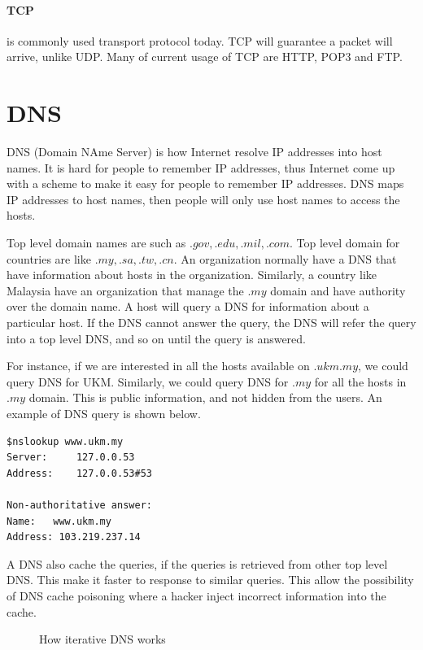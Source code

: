 \documentclass[7x9]{times}
\begin{document}
\paragraph{TCP} is commonly used transport protocol today. 
TCP will guarantee a packet will arrive, unlike UDP. Many 
of current usage of TCP are HTTP, POP3 and FTP.





\section{DNS}

DNS (Domain NAme Server) is how Internet resolve IP
addresses into host names. It is hard for people to remember
IP addresses, thus Internet come up with a scheme to make it
easy for people to remember IP addresses. DNS maps  IP 
addresses to host names, then people will only use host 
names to access the hosts. 

Top level domain names are such as $.gov, .edu, .mil, .com$.
Top level domain for countries are like $.my, .sa, .tw,
.cn$. An organization normally have a DNS that have 
information about hosts in the organization. Similarly, a 
country like Malaysia have an organization that manage the 
$.my$ domain and have authority over the domain name.
A host will query a  DNS for information about a particular
host. If the DNS cannot answer the query, the DNS will refer
the query into a top level DNS, and so on until the query is
answered.

For instance, if we are interested in all the hosts
available on $.ukm.my$, we could query DNS for UKM.
Similarly, we could query DNS for $.my$ for all the hosts in
$.my$ domain. This is public information, and not hidden
from the users. An example of DNS query is shown below.

\begin{verbatim}
$nslookup www.ukm.my
Server:		127.0.0.53
Address:	127.0.0.53#53

Non-authoritative answer:
Name:	www.ukm.my
Address: 103.219.237.14
\end{verbatim}

A DNS also cache the queries, if the queries is retrieved
from other top level DNS. This make it faster to response to
similar queries. This allow the possibility of DNS cache
poisoning where a hacker inject incorrect information into
the cache.

\begin{figure}[ht]
    \centering
    \def\svgwidth{.85\textwidth}
    
    \caption{How iterative DNS works}
\end{figure}
\end{document}
